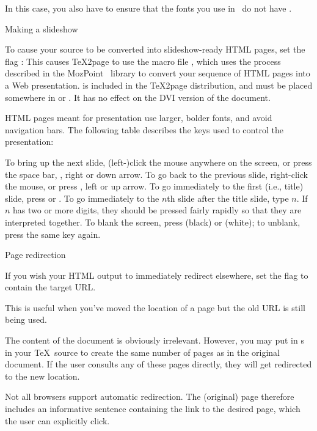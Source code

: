 
\n In this case, you also have to ensure that the fonts you use in \XeTeX\ do not have .

\beginsection Making a slideshow

%
To cause your source to be converted into slideshow-ready HTML pages,
set the flag \p{\TZPslides}:
This causes \TeX2page to use the macro file
, which uses the process described in
the MozPoint~\cite{mozpoint} library
to convert your sequence of HTML
pages into a Web presentation.   is included in the
\TeX2page distribution, and must be placed
somewhere in  or .  It has no
effect on the DVI version of the document.

HTML pages meant for presentation use larger, bolder fonts, and
avoid navigation bars.  The following table describes the keys used to
control the presentation:

To bring up the next slide, (left-)click the mouse
anywhere  on the screen, or press the space bar, , right or down
arrow.  To go back to the previous slide, right-click the
mouse, or press , left or up arrow.
To go immediately to the first (i.e., title) slide, press  or .  To go
immediately to the $n$th slide after the title slide, type $n$.  If $n$ has
two or more digits, they should be pressed fairly rapidly so that they are
interpreted together.  To blank the screen, press 
(black) or  (white); to unblank, press the same key again.

\beginsection Page redirection

If you wish your HTML output to immediately redirect elsewhere,
set the flag \p{\TZPredirect} to contain the target URL.

This is useful when
you’ve moved the location of a page but the old URL is still being used.

The content of the document is obviously irrelevant.  However, you may
put in \p{\eject}s in your \TeX\ source to create the same number of pages as
in the original document.  If the user consults any of these pages
directly, they will get redirected to the new location.

Not all browsers support automatic redirection. The (original)
page therefore includes an informative sentence containing the
link to the desired page, which the user can explicitly click.


